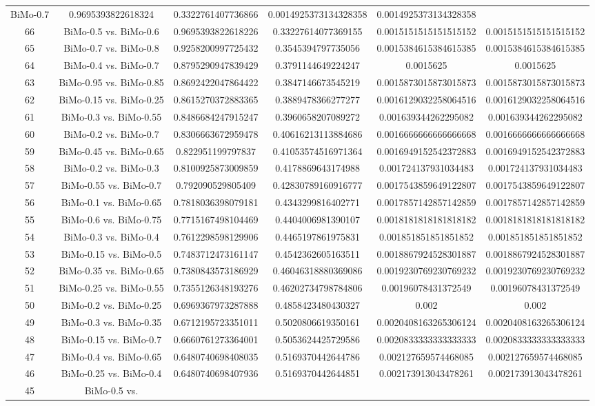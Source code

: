 \documentclass[a4paper,10pt]{article}
\begin{document}
\begin{landscape}
\begin{table}[!htp]
\begin{tabular}{cccccc}
BiMo-0.7&0.9695393822618324&0.3322761407736866&0.0014925373134328358&0.0014925373134328358\\66&BiMo-0.5 vs. BiMo-0.6&0.9695393822618226&0.33227614077369155&0.0015151515151515152&0.0015151515151515152\\65&BiMo-0.7 vs. BiMo-0.8&0.9258200997725432&0.3545394797735056&0.0015384615384615385&0.0015384615384615385\\64&BiMo-0.4 vs. BiMo-0.7&0.8795290947839429&0.3791144649224247&0.0015625&0.0015625\\63&BiMo-0.95 vs. BiMo-0.85&0.8692422047864422&0.3847146673545219&0.0015873015873015873&0.0015873015873015873\\62&BiMo-0.15 vs. BiMo-0.25&0.8615270372883365&0.3889478366277277&0.0016129032258064516&0.0016129032258064516\\61&BiMo-0.3 vs. BiMo-0.55&0.8486684247915247&0.3960658207089272&0.001639344262295082&0.001639344262295082\\60&BiMo-0.2 vs. BiMo-0.7&0.8306663672959478&0.40616213113884686&0.0016666666666666668&0.0016666666666666668\\59&BiMo-0.45 vs. BiMo-0.65&0.822951199797837&0.41053574516971364&0.0016949152542372883&0.0016949152542372883\\58&BiMo-0.2 vs. BiMo-0.3&0.8100925873009859&0.4178869643174988&0.001724137931034483&0.001724137931034483\\57&BiMo-0.55 vs. BiMo-0.7&0.792090529805409&0.42830789160916777&0.0017543859649122807&0.0017543859649122807\\56&BiMo-0.1 vs. BiMo-0.65&0.7818036398079181&0.4343299816402771&0.0017857142857142859&0.0017857142857142859\\55&BiMo-0.6 vs. BiMo-0.75&0.7715167498104469&0.4404006981390107&0.0018181818181818182&0.0018181818181818182\\54&BiMo-0.3 vs. BiMo-0.4&0.7612298598129906&0.4465197861975831&0.001851851851851852&0.001851851851851852\\53&BiMo-0.15 vs. BiMo-0.5&0.7483712473161147&0.4542362605163511&0.0018867924528301887&0.0018867924528301887\\52&BiMo-0.35 vs. BiMo-0.65&0.7380843573186929&0.46046318880369086&0.0019230769230769232&0.0019230769230769232\\51&BiMo-0.25 vs. BiMo-0.55&0.7355126348193276&0.46202734798784806&0.00196078431372549&0.00196078431372549\\50&BiMo-0.2 vs. BiMo-0.25&0.6969367973287888&0.4858423480430327&0.002&0.002\\49&BiMo-0.3 vs. BiMo-0.35&0.6712195723351011&0.5020806619350161&0.0020408163265306124&0.0020408163265306124\\48&BiMo-0.15 vs. BiMo-0.7&0.6660761273364001&0.5053624425729586&0.0020833333333333333&0.0020833333333333333\\47&BiMo-0.4 vs. BiMo-0.65&0.6480740698408035&0.5169370442644786&0.002127659574468085&0.002127659574468085\\46&BiMo-0.25 vs. BiMo-0.4&0.6480740698407936&0.5169370442644851&0.002173913043478261&0.002173913043478261\\45&BiMo-0.5 vs. 
\end{tabular}
\end{table}
\end{landscape}
\end{document}
